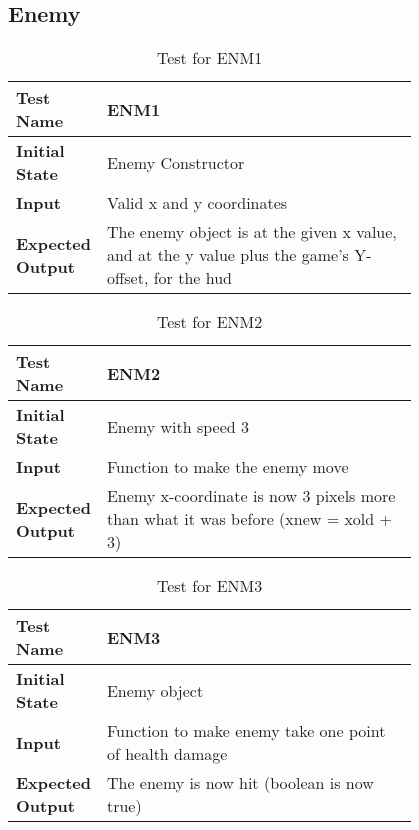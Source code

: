 \documentclass[12pt, titlepage]{article}
\begin{document}
\newpage

\subsection{Enemy}

\begin{table}[!htbp]
	
	\begin{tabular}[r]{|l|p{0.8\linewidth}|}
		
		\hline
		
		\textbf{Test Name} & ENM1 \\ 
		\hline
		\textbf{Initial State} & Enemy Constructor \\ 
		\hline
		\textbf{Input} & Valid x and y coordinates \\ 
		\hline 
		\textbf{Expected Output} & The enemy object is at the given x value, and at the y value plus the game's Y-offset, for the hud  \\ 
		\hline
		
	\end{tabular}
	\caption{Test for ENM1}
	\label{Table}
\end{table}

\begin{table}[!htbp]
	
	\begin{tabular}[r]{|l|p{0.8\linewidth}}
		
		\hline
		
		\textbf{Test Name} & ENM2 \\ 
		\hline
		\textbf{Initial State} & Enemy with speed 3 \\ 
		\hline
		\textbf{Input} & Function to make the enemy move \\ 
		\hline 
		\textbf{Expected Output} & Enemy x-coordinate is now 3 pixels more than what it was before (xnew = xold + 3)  \\ 
		\hline
		
	\end{tabular}
	\caption{Test for ENM2}
	\label{Table}
\end{table}

\begin{table}[!htbp]
	
	\begin{tabular}[r]{|l|p{0.8\linewidth}|}
		
		\hline
		
		\textbf{Test Name} & ENM3 \\ 
		\hline
		\textbf{Initial State} & Enemy object \\ 
		\hline
		\textbf{Input} & Function to make enemy take one point of health damage \\ 
		\hline 
		\textbf{Expected Output} & The enemy is now hit (boolean is now true)  \\ 
		\hline
		
	\end{tabular}
	\caption{Test for ENM3}
	\label{Table}
\end{table}
\end{document}
